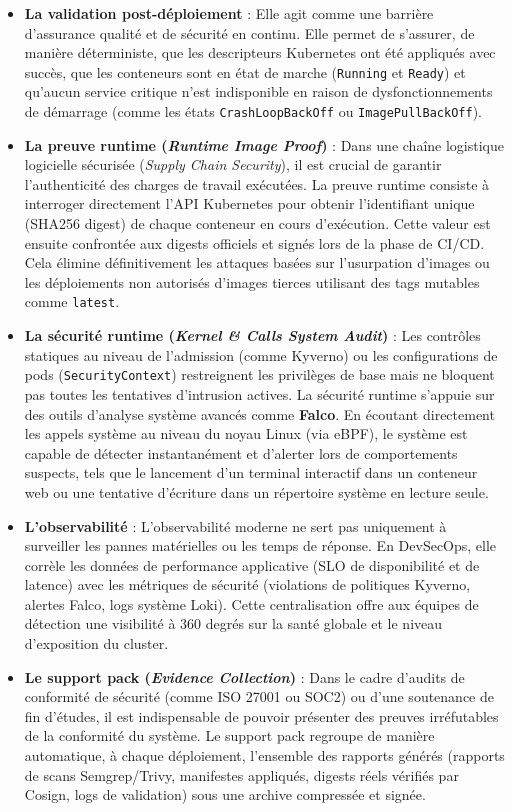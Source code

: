 \begin{itemize}
  \item \textbf{La validation post-déploiement} : Elle agit comme une barrière d'assurance qualité et de sécurité en continu. Elle permet de s'assurer, de manière déterministe, que les descripteurs Kubernetes ont été appliqués avec succès, que les conteneurs sont en état de marche (\texttt{Running} et \texttt{Ready}) et qu'aucun service critique n'est indisponible en raison de dysfonctionnements de démarrage (comme les états \texttt{CrashLoopBackOff} ou \texttt{ImagePullBackOff}).
  \item \textbf{La preuve runtime (\textit{Runtime Image Proof})} : Dans une chaîne logistique logicielle sécurisée (\textit{Supply Chain Security}), il est crucial de garantir l'authenticité des charges de travail exécutées. La preuve runtime consiste à interroger directement l'API Kubernetes pour obtenir l'identifiant unique (SHA256 digest) de chaque conteneur en cours d'exécution. Cette valeur est ensuite confrontée aux digests officiels et signés lors de la phase de CI/CD. Cela élimine définitivement les attaques basées sur l'usurpation d'images ou les déploiements non autorisés d'images tierces utilisant des tags mutables comme \texttt{latest}.
  \item \textbf{La sécurité runtime (\textit{Kernel \& Calls System Audit})} : Les contrôles statiques au niveau de l'admission (comme Kyverno) ou les configurations de pods (\texttt{SecurityContext}) restreignent les privilèges de base mais ne bloquent pas toutes les tentatives d'intrusion actives. La sécurité runtime s'appuie sur des outils d'analyse système avancés comme \textbf{Falco}. En écoutant directement les appels système au niveau du noyau Linux (via eBPF), le système est capable de détecter instantanément et d'alerter lors de comportements suspects, tels que le lancement d'un terminal interactif dans un conteneur web ou une tentative d'écriture dans un répertoire système en lecture seule.
  \item \textbf{L'observabilité} : L'observabilité moderne ne sert pas uniquement à surveiller les pannes matérielles ou les temps de réponse. En DevSecOps, elle corrèle les données de performance applicative (SLO de disponibilité et de latence) avec les métriques de sécurité (violations de politiques Kyverno, alertes Falco, logs système Loki). Cette centralisation offre aux équipes de détection une visibilité à 360 degrés sur la santé globale et le niveau d'exposition du cluster.
  \item \textbf{Le support pack (\textit{Evidence Collection})} : Dans le cadre d'audits de conformité de sécurité (comme ISO 27001 ou SOC2) ou d'une soutenance de fin d'études, il est indispensable de pouvoir présenter des preuves irréfutables de la conformité du système. Le support pack regroupe de manière automatique, à chaque déploiement, l'ensemble des rapports générés (rapports de scans Semgrep/Trivy, manifestes appliqués, digests réels vérifiés par Cosign, logs de validation) sous une archive compressée et signée.

\end{itemize}
